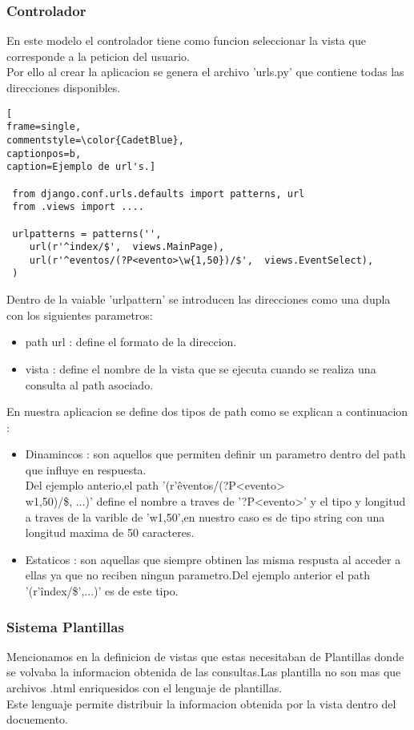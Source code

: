 \subsubsection{Controlador}
En este modelo el controlador tiene como funcion seleccionar la vista que corresponde a la peticion del usuario.
\\Por ello al crear la aplicacion se genera el archivo 'urls.py' que contiene todas las direcciones disponibles.
\begin{lstlisting}[
frame=single,
commentstyle=\color{CadetBlue},
captionpos=b,
caption=Ejemplo de url's.]

 from django.conf.urls.defaults import patterns, url
 from .views import ....

 urlpatterns = patterns('',
 	url(r'^index/$',  views.MainPage),
	url(r'^eventos/(?P<evento>\w{1,50})/$',  views.EventSelect),
 )
\end{lstlisting}
Dentro de la vaiable 'urlpattern' se introducen las direcciones como una dupla con los siguientes parametros:
\begin{itemize}
\item path url : define el formato de la direccion.
\item vista : define el nombre de la vista que se ejecuta cuando se realiza una consulta al path asociado.
\end{itemize}
En nuestra aplicacion se define dos tipos de path como se explican a continuacion :
\begin{itemize}
\item Dinamincos : son aquellos que permiten definir un parametro dentro del path que influye en respuesta.
\\Del ejemplo anterio,el path '(r'\^ eventos/(?P<evento>\\w{1,50})/\$, ...)' define el nombre a traves de '?P<evento>' y el tipo y longitud a traves de la varible de 'w{1,50}',en nuestro caso es de tipo string con una longitud maxima de 50 caracteres.
\item Estaticos : son aquellas que siempre obtinen las misma respusta al acceder a ellas ya que no reciben ningun parametro.Del ejemplo anterior el path '(r'\^index/\$',...)' es de este tipo.
\end{itemize}
\subsubsection{Sistema Plantillas}
Mencionamos en la definicion de vistas que estas necesitaban de Plantillas donde se volvaba la informacion obtenida de las consultas.Las plantilla no son mas que archivos .html enriquesidos con el lenguaje de plantillas.
\\Este lenguaje permite distribuir la informacion obtenida por la vista dentro del docuemento.


